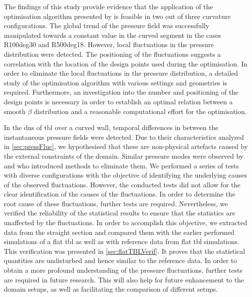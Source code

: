 The findings of this study provide evidence that the application of the optimisation algorithm presented by \citet{morita_applying_2022} is feasible in two out of three curvature configurations.
The global trend of the pressure field was successfully manipulated towards a constant value in the curved segment in the cases R100deg30 and R500deg18.
However, local fluctuations in the pressure distribution were detected.
The positioning of the fluctuations suggests a correlation with the location  of the design points used during the optimisation.
In order to eliminate the local fluctuations in the pressure distribution, a detailed study of the optimisation algorithm with various settings and geometries is required.
Furthermore, an investigation into the number and positioning of the design points is necessary in order to establish an optimal relation between a smooth $\beta$ distribution and a reasonable computational effort for the optimisation.


In the \acrshort{dns} of \acrshort{tbl} over a curved wall, temporal differences in between the instantaneous pressure fields were detected.
Due to their characteristics analysed in \autoref{sec:pressFluc}, we hypothesised that these are non-physical artefacts caused by the external constraints of the domain.
Similar pressure modes were observed by \citet{maday_spectral_1989} and \citet{sabbah_filtering_2001} who introduced methods to eliminate them.
We performed a series of tests with diverse configurations with the objective of identifying the underlying causes of the observed fluctuations.
However, the conducted tests did not allow for the clear identification of  the causes of the fluctuations.
In order to determine the root cause of these fluctuations, further tests are required.
Nevertheless, we verified the reliability of the statistical results to ensure that the statistics are unaffected by the fluctuations.
In order to accomplish this objective, we extracted data from the straight section and compared them with the earlier performed simulations of a flat \acrshort{tbl} as well as with reference data from flat \acrshort{tbl} simulations.
This verification was presented in \autoref{sec:flatTBLVerif}. It proves  that the statistical quantities are undisturbed and hence similar to the reference data.
In order to obtain a more profound understanding of the pressure fluctuations, further tests are required in future research.
This will also help for future enhancement to the domain setups, as well as facilitating the comparison of different setups.
